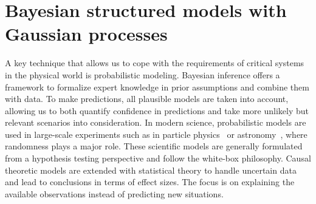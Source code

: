 \section{Bayesian structured models with Gaussian processes}
A key technique that allows us to cope with the requirements of critical systems in the physical world is probabilistic modeling.
Bayesian inference offers a framework to formalize expert knowledge in prior assumptions and combine them with data.
To make predictions, all plausible models are taken into account, allowing us to both quantify confidence in predictions and take more unlikely but relevant scenarios into consideration.
In modern science, probabilistic models are used in large-scale experiments such as in particle physics~\parencite{khachatryan_observation_2015} or astronomy~\parencite{collaboration_first_2019,the_ligo_scientific_collaboration_observation_2016}, where randomness plays a major role.
These scientific models are generally formulated from a hypothesis testing perspective and follow the white-box philosophy.
Causal theoretic models are extended with statistical theory to handle uncertain data and lead to conclusions in terms of effect sizes.
The focus is on explaining the available observations instead of predicting new situations.

